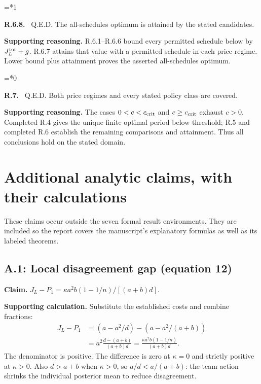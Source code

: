 \documentclass[12pt,letterpaper]{article}
\newenvironment{proofstep}[2]{%
  \begin{list}{}{\leftmargin=\dimexpr 0.17in*#2\relax%
  \setlength{\rightmargin}{0pt}\setlength{\topsep}{5pt}\setlength{\parsep}{2pt}}%
  \item[]\textbf{\textcolor{ink}{#1.}}\ }{\end{list}}
\begin{document}
\begin{proofstep}{R.6.8}{1}
\label{step:R.6.8}
Q.E.D. The all-schedules optimum is attained by the stated candidates.

\textbf{Supporting reasoning.}
R.6.1--R.6.6 bound every permitted schedule below by $J_L^{\rm tot}+g$. R.6.7 attains that value with a permitted schedule in each price regime. Lower bound plus attainment proves the asserted all-schedules optimum.
\par{}
\end{proofstep}

\begin{proofstep}{R.7}{0}
\label{step:R.7}
Q.E.D. Both price regimes and every stated policy class are covered.

\textbf{Supporting reasoning.}
The cases $0<c<c_{\rm crit}$ and $c\ge c_{\rm crit}$ exhaust $c>0$. Completed R.4 gives the unique finite optimal period below threshold; R.5 and completed R.6 establish the remaining comparisons and attainment. Thus all conclusions hold on the stated domain.
\par{}
\end{proofstep}

\clearpage
\section{Additional analytic claims, with their calculations}
These claims occur outside the seven formal result environments. They are included so the report covers the manuscript's explanatory formulas as well as its labeled theorems.

\subsection{A.1: Local disagreement gap (equation 12)}
\textbf{Claim.} $J_L-P_1=\kappa a^2b(1-1/n)/[(a+b)d]$.

\textbf{Supporting calculation.} Substitute the established costs and combine fractions:
\begin{align*}
J_L-P_1&=(a-a^2/d)-(a-a^2/(a+b))\\
&=a^2\frac{d-(a+b)}{(a+b)d}
=\frac{\kappa a^2b(1-1/n)}{(a+b)d}.
\end{align*}
The denominator is positive. The difference is zero at $\kappa=0$ and strictly positive at $\kappa>0$. Also $d>a+b$ when $\kappa>0$, so $a/d<a/(a+b)$: the team action shrinks the individual posterior mean to reduce disagreement.
\end{document}
